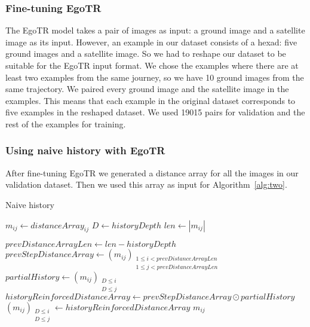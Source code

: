 \documentclass[10pt,letterpaper]{article}
\begin{document}
\subsubsection*{Fine-tuning EgoTR}
The EgoTR model takes a pair of images as input: a ground image and a satellite image as its input. However, an example in our dataset consists of a hexad: five ground images and a satellite image. So we had to reshape our dataset to be suitable for the EgoTR input format. We chose the examples where there are at least two examples from the same journey, so we have 10 ground images from the same trajectory. We paired every ground image and the satellite image in the examples. This means that each example in the original dataset corresponds to five examples in the reshaped dataset. We used 19015 pairs for validation and the rest of the examples for training.

\subsubsection*{Using naive history with EgoTR}
After fine-tuning EgoTR we generated a distance array for all the images in our validation dataset. Then we used this array as input for Algorithm~\ref{alg:two}.

\begin{algorithm}[H]
  \label{algorithm2}
  \caption{Naive history}\label{alg:two}
  $m_{ij} \gets distanceArray_{ij}$\;
  $D \gets historyDepth$\;
  $len \gets |m_{ij}|$\;
  
   {
      $prevDistanceArrayLen \gets len - historyDepth$\;
      $prevStepDistanceArray \gets (m_{ij})_{\substack{1\le i < prevDistanceArrayLen \\ 1\le j < prevDistanceArrayLen }}$\;
      $partialHistory \gets (m_{ij})_{\substack{D \le i \\ D \le j}}$\;
      $historyReinforcedDistanceArray \gets prevStepDistanceArray \odot partialHistory$\;
      $(m_{ij})_{\substack{D \le i \\ D \le j}} \gets historyReinforcedDistanceArray$\;
  }
  \Return $m_{ij}$\;
\end{algorithm}
\end{document}
